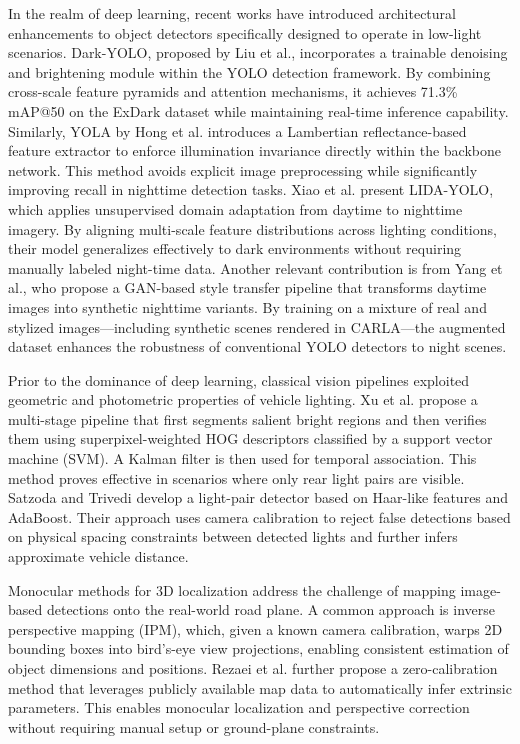 In the realm of deep learning, recent works have introduced architectural enhancements to object detectors specifically designed to operate in low-light scenarios. Dark-YOLO, proposed by Liu et al.\cite{app15095170}, incorporates a trainable denoising and brightening module within the YOLO detection framework. By combining cross-scale feature pyramids and attention mechanisms, it achieves 71.3\% mAP@50 on the ExDark dataset while maintaining real-time inference capability. Similarly, YOLA by Hong et al.\cite{hong2024lookaroundlearningillumination} introduces a Lambertian reflectance-based feature extractor to enforce illumination invariance directly within the backbone network. This method avoids explicit image preprocessing while significantly improving recall in nighttime detection tasks. Xiao et al.\cite{doi:10.1049/ipr2.13017} present LIDA-YOLO, which applies unsupervised domain adaptation from daytime to nighttime imagery. By aligning multi-scale feature distributions across lighting conditions, their model generalizes effectively to dark environments without requiring manually labeled night-time data. Another relevant contribution is from Yang et al.\cite{yang2024enhancingnighttimevehicledetection}, who propose a GAN-based style transfer pipeline that transforms daytime images into synthetic nighttime variants. By training on a mixture of real and stylized images—including synthetic scenes rendered in CARLA—the augmented dataset enhances the robustness of conventional YOLO detectors to night scenes.

Prior to the dominance of deep learning, classical vision pipelines exploited geometric and photometric properties of vehicle lighting. Xu et al.\cite{Zhang2024S_HOG} propose a multi-stage pipeline that first segments salient bright regions and then verifies them using superpixel-weighted HOG descriptors classified by a support vector machine (SVM). A Kalman filter is then used for temporal association. This method proves effective in scenarios where only rear light pairs are visible. Satzoda and Trivedi\cite{satzoda2019lightpair} develop a light-pair detector based on Haar-like features and AdaBoost. Their approach uses camera calibration to reject false detections based on physical spacing constraints between detected lights and further infers approximate vehicle distance.

Monocular methods for 3D localization address the challenge of mapping image-based detections onto the real-world road plane. A common approach is inverse perspective mapping (IPM), which, given a known camera calibration, warps 2D bounding boxes into bird’s-eye view projections, enabling consistent estimation of object dimensions and positions\cite{Ali2020IPM}. Rezaei et al.\cite{rezaei2023zerocalib} further propose a zero-calibration method that leverages publicly available map data to automatically infer extrinsic parameters. This enables monocular localization and perspective correction without requiring manual setup or ground-plane constraints.

